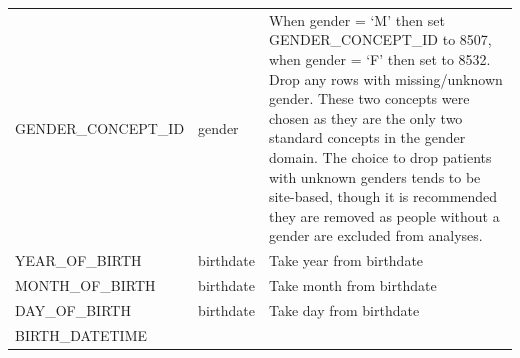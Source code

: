 \documentclass[10.5pt]{book}
\theoremstyle{definition}
\theoremstyle{definition}
\theoremstyle{definition}
\theoremstyle{remark}
\begin{document}
\begin{longtable}[]{@{}lll@{}}
\begin{minipage}[t]{0.28\columnwidth}
GENDER\_CONCEPT\_ID\strut
\end{minipage} & \begin{minipage}[t]{0.13\columnwidth}\raggedright\strut
gender\strut
\end{minipage} & \begin{minipage}[t]{0.50\columnwidth}\raggedright\strut
When gender = `M' then set GENDER\_CONCEPT\_ID to 8507, when gender =
`F' then set to 8532. Drop any rows with missing/unknown gender. These
two concepts were chosen as they are the only two standard concepts in
the gender domain. The choice to drop patients with unknown genders
tends to be site-based, though it is recommended they are removed as
people without a gender are excluded from analyses.\strut
\end{minipage}\tabularnewline
\begin{minipage}[t]{0.28\columnwidth}\raggedright\strut
YEAR\_OF\_BIRTH\strut
\end{minipage} & \begin{minipage}[t]{0.13\columnwidth}\raggedright\strut
birthdate\strut
\end{minipage} & \begin{minipage}[t]{0.50\columnwidth}\raggedright\strut
Take year from birthdate\strut
\end{minipage}\tabularnewline
\begin{minipage}[t]{0.28\columnwidth}\raggedright\strut
MONTH\_OF\_BIRTH\strut
\end{minipage} & \begin{minipage}[t]{0.13\columnwidth}\raggedright\strut
birthdate\strut
\end{minipage} & \begin{minipage}[t]{0.50\columnwidth}\raggedright\strut
Take month from birthdate\strut
\end{minipage}\tabularnewline
\begin{minipage}[t]{0.28\columnwidth}\raggedright\strut
DAY\_OF\_BIRTH\strut
\end{minipage} & \begin{minipage}[t]{0.13\columnwidth}\raggedright\strut
birthdate\strut
\end{minipage} & \begin{minipage}[t]{0.50\columnwidth}\raggedright\strut
Take day from birthdate\strut
\end{minipage}\tabularnewline
\begin{minipage}[t]{0.28\columnwidth}\raggedright\strut
BIRTH\_DATETIME\strut
\end{minipage} & \begin{minipage}[t]{0.13\columnwidth}\raggedright\strut

\end{minipage}
\end{longtable}
\end{document}
